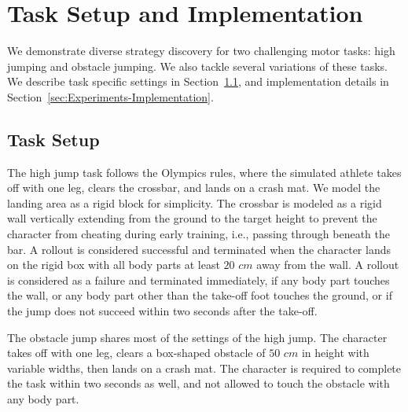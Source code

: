 \section{Task Setup and Implementation}
\label{sec:Experiments}

We demonstrate diverse strategy discovery for two challenging motor tasks: high jumping and obstacle jumping. We also tackle several variations of these tasks. We describe task specific settings in Section~\ref{sec:Experiments-Task-Setup}, and implementation details in Section~\ref{sec:Experiments-Implementation}. 

\subsection{Task Setup}
\label{sec:Experiments-Task-Setup}
The high jump task follows the Olympics rules, where the simulated athlete takes off with one leg, clears the crossbar, and lands on a crash mat. We model the landing area as a rigid block for simplicity. The crossbar is modeled as a rigid wall vertically extending from the ground to the target height to prevent the character from cheating during early training, i.e., passing through beneath the bar. A rollout is considered successful and terminated when the character lands on the rigid box with all body parts at least $20$ $cm$ away from the wall. A rollout is considered as a failure and terminated immediately, if any body part touches the wall, or any body part other than the take-off foot touches the ground, or if the jump does not succeed within two seconds after the take-off.

The obstacle jump shares most of the settings of the high jump. The character takes off with one leg, clears a box-shaped obstacle of $50$ $cm$ in height with variable widths, then lands on a crash mat. The character is required to complete the task within two seconds as well, and not allowed to touch the obstacle with any body part.

